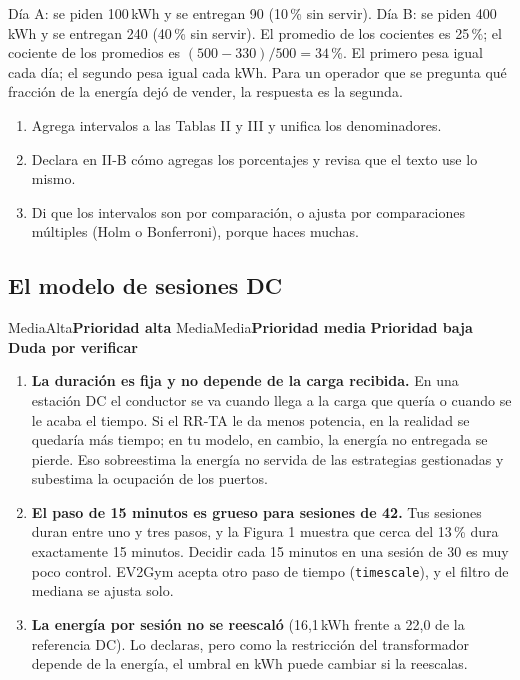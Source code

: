 \documentclass[11pt]{article}
\newcommand{\prioridad}[1]{%
  \def\tmpA{Alta}\def\tmpM{Media}\def\tmp{#1}%
  \ifx\tmp\tmpA\colorbox{rojoerror}{\color{white}\small\bfseries Prioridad alta}%
  \else\ifx\tmp\tmpM\colorbox{naranjatarea}{\color{white}\small\bfseries Prioridad media}%
  \else\colorbox{azulidea}{\color{white}\small\bfseries Prioridad baja}\fi\fi}
\newcommand{\pordudar}{\colorbox{black!10}{\small\bfseries\color{black!75} Duda por verificar}}
\begin{document}
\begin{ejemplo}
Día A: se piden 100\,kWh y se entregan 90 (10\,\% sin servir). Día B: se piden 400\,kWh y se entregan 240 (40\,\% sin servir). El promedio de los cocientes es 25\,\%; el cociente de los promedios es $(500-330)/500 = 34$\,\%. El primero pesa igual cada día; el segundo pesa igual cada kWh. Para un operador que se pregunta qué fracción de la energía dejó de vender, la respuesta es la segunda.
\end{ejemplo}

\begin{tarea}
\begin{enumerate}
\item Agrega intervalos a las Tablas II y III y unifica los denominadores.
\item Declara en II-B cómo agregas los porcentajes y revisa que el texto use lo mismo.
\item Di que los intervalos son por comparación, o ajusta por comparaciones múltiples (Holm o Bonferroni), porque haces muchas.
\end{enumerate}
\end{tarea}

\subsection{El modelo de sesiones DC}
\prioridad{Media} \pordudar

\begin{duda}
\begin{enumerate}[leftmargin=1.5em]
\item \textbf{La duración es fija y no depende de la carga recibida.} En una estación DC el conductor se va cuando llega a la carga que quería o cuando se le acaba el tiempo. Si el RR-TA le da menos potencia, en la realidad se quedaría más tiempo; en tu modelo, en cambio, la energía no entregada se pierde. Eso sobreestima la energía no servida de las estrategias gestionadas y subestima la ocupación de los puertos.
\item \textbf{El paso de 15 minutos es grueso para sesiones de 42.} Tus sesiones duran entre uno y tres pasos, y la Figura 1 muestra que cerca del 13\,\% dura exactamente 15 minutos. Decidir cada 15 minutos en una sesión de 30 es muy poco control. EV2Gym acepta otro paso de tiempo (\texttt{timescale}), y el filtro de mediana se ajusta solo.
\item \textbf{La energía por sesión no se reescaló} (16,1\,kWh frente a 22,0 de la referencia DC). Lo declaras, pero como la restricción del transformador depende de la energía, el umbral en kWh puede cambiar si la reescalas.
\end{enumerate}
\end{duda}
\end{document}
